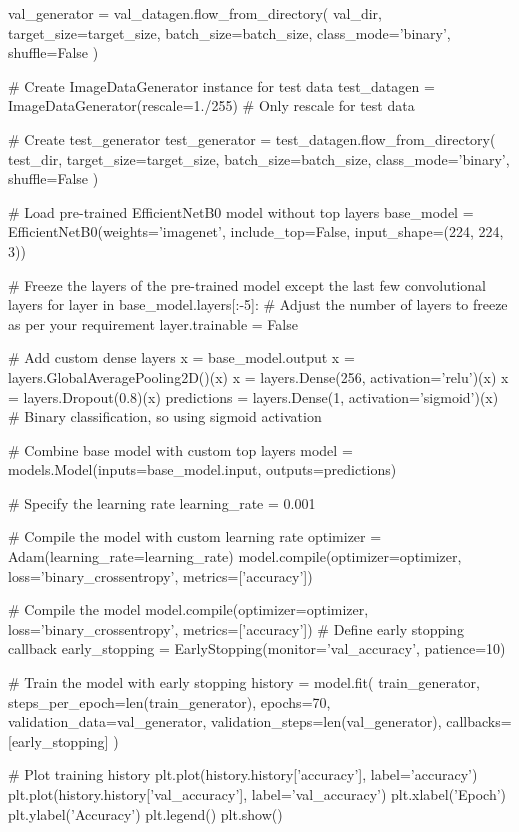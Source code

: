 \begin{python}[caption={Python code for training the model}]
val_generator = val_datagen.flow_from_directory(
    val_dir,
    target_size=target_size,
    batch_size=batch_size,
    class_mode='binary',
    shuffle=False
)

# Create ImageDataGenerator instance for test data
test_datagen = ImageDataGenerator(rescale=1./255)  # Only rescale for test data

# Create test_generator
test_generator = test_datagen.flow_from_directory(
    test_dir,
    target_size=target_size,
    batch_size=batch_size,
    class_mode='binary',
    shuffle=False
)

# Load pre-trained EfficientNetB0 model without top layers
base_model = EfficientNetB0(weights='imagenet', include_top=False, input_shape=(224, 224, 3))

# Freeze the layers of the pre-trained model except the last few convolutional layers
for layer in base_model.layers[:-5]:  # Adjust the number of layers to freeze as per your requirement
    layer.trainable = False

# Add custom dense layers
x = base_model.output
x = layers.GlobalAveragePooling2D()(x)
x = layers.Dense(256, activation='relu')(x)
x = layers.Dropout(0.8)(x)
predictions = layers.Dense(1, activation='sigmoid')(x)  # Binary classification, so using sigmoid activation

# Combine base model with custom top layers
model = models.Model(inputs=base_model.input, outputs=predictions)

# Specify the learning rate
learning_rate = 0.001

# Compile the model with custom learning rate
optimizer = Adam(learning_rate=learning_rate)
model.compile(optimizer=optimizer, loss='binary_crossentropy', metrics=['accuracy'])

# Compile the model
model.compile(optimizer=optimizer, loss='binary_crossentropy', metrics=['accuracy'])
# Define early stopping callback
early_stopping = EarlyStopping(monitor='val_accuracy', patience=10)

# Train the model with early stopping
history = model.fit(
    train_generator,
    steps_per_epoch=len(train_generator),
    epochs=70,
    validation_data=val_generator,
    validation_steps=len(val_generator),
    callbacks=[early_stopping]
)

# Plot training history
plt.plot(history.history['accuracy'], label='accuracy')
plt.plot(history.history['val_accuracy'], label='val_accuracy')
plt.xlabel('Epoch')
plt.ylabel('Accuracy')
plt.legend()
plt.show()


\end{python}

